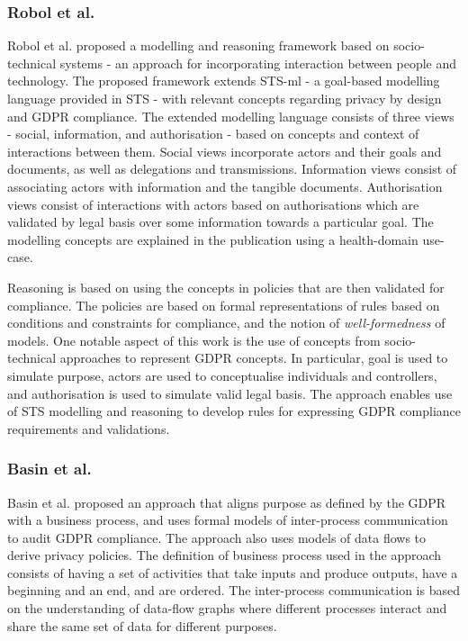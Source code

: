 \subsubsection{Robol et al.}
Robol et al. \cite{robol_toward_2017} proposed a modelling and reasoning framework based on socio-technical systems \cite{dalpiaz_security_2016} - an approach for incorporating interaction between people and technology. The proposed framework extends STS-ml - a goal-based modelling language provided in STS - with relevant concepts regarding privacy by design and GDPR compliance. The extended modelling language consists of three views - social, information, and authorisation - based on concepts and context of interactions between them. Social views incorporate actors and their goals and documents, as well as delegations and transmissions. Information views consist of associating actors with information and the tangible documents. Authorisation views consist of interactions with actors based on authorisations which are validated by legal basis over some information towards a particular goal. The modelling concepts are explained in the publication using a health-domain use-case.

Reasoning is based on using the concepts in policies that are then validated for compliance. The policies are based on formal representations of rules based on conditions and constraints for compliance, and the notion of \textit{well-formedness} of models. One notable aspect of this work is the use of concepts from socio-technical approaches to represent GDPR concepts. In particular, goal is used to simulate purpose, actors are used to conceptualise individuals and controllers, and authorisation is used to simulate valid legal basis. The approach enables use of STS modelling and reasoning to develop rules for expressing GDPR compliance requirements and validations.

\subsubsection{Basin et al.}
Basin et al. \cite{basin_purpose_2018} proposed an approach that aligns purpose as defined by the GDPR with a business process, and uses formal models of inter-process communication to audit GDPR compliance. The approach also uses models of data flows to derive privacy policies. 
The definition of business process used in the approach consists of having a set of activities that take inputs and produce outputs, have a beginning and an end, and are ordered. The inter-process communication is based on the understanding of data-flow graphs where different processes interact and share the same set of data for different purposes.


